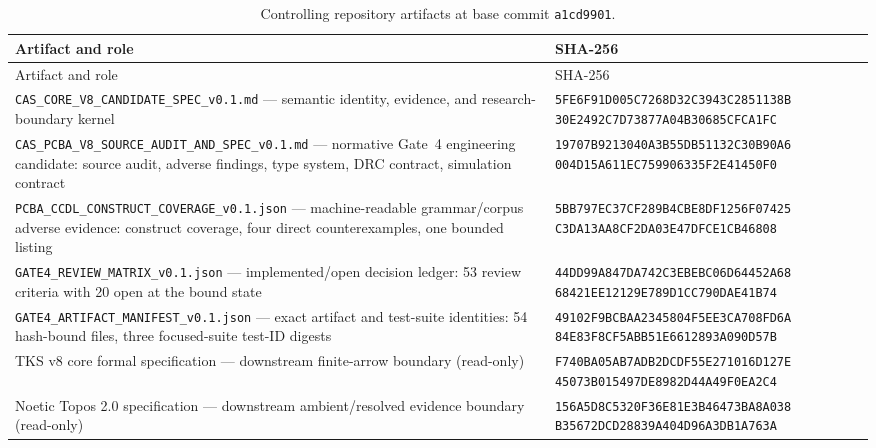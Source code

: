 \begin{longtable}{@{}p{5.2cm}p{7.6cm}@{}}
\caption{Controlling repository artifacts at base commit \texttt{a1cd9901}.}\label{ch03:tab:artifacts}\\
\toprule
Artifact and role & SHA-256 \\
\midrule
\endfirsthead
\toprule
Artifact and role & SHA-256 \\
\midrule
\endhead
\bottomrule
\endfoot
\texttt{CAS\_CORE\_V8\_CANDIDATE\_SPEC\_v0.1.md} --- semantic identity,
evidence, and research-boundary kernel &
\texttt{5FE6F91D005C7268D32C3943C2851138B\newline
30E2492C7D73877A04B30685CFCA1FC} \\[2pt]
\texttt{CAS\_PCBA\_V8\_SOURCE\_AUDIT\_AND\_SPEC\_v0.1.md} --- normative
Gate~4 engineering candidate: source audit, adverse findings, type
system, DRC contract, simulation contract &
\texttt{19707B9213040A3B55DB51132C30B90A6\newline
004D15A611EC759906335F2E41450F0} \\[2pt]
\texttt{PCBA\_CCDL\_CONSTRUCT\_COVERAGE\_v0.1.json} --- machine-readable
grammar/corpus adverse evidence: construct coverage, four direct
counterexamples, one bounded listing &
\texttt{5BB797EC37CF289B4CBE8DF1256F07425\newline
C3DA13AA8CF2DA03E47DFCE1CB46808} \\[2pt]
\texttt{GATE4\_REVIEW\_MATRIX\_v0.1.json} --- implemented/open decision
ledger: 53 review criteria with 20 open at the bound state &
\texttt{44DD99A847DA742C3EBEBC06D64452A68\newline
68421EE12129E789D1CC790DAE41B74} \\[2pt]
\texttt{GATE4\_ARTIFACT\_MANIFEST\_v0.1.json} --- exact artifact and
test-suite identities: 54 hash-bound files, three focused-suite test-ID
digests &
\texttt{49102F9BCBAA2345804F5EE3CA708FD6A\newline
84E83F8CF5ABB51E6612893A090D57B} \\[2pt]
TKS v8 core formal specification --- downstream finite-arrow boundary
(read-only) &
\texttt{F740BA05AB7ADB2DCDF55E271016D127E\newline
45073B015497DE8982D44A49F0EA2C4} \\[2pt]
Noetic Topos 2.0 specification --- downstream ambient/resolved evidence
boundary (read-only) &
\texttt{156A5D8C5320F36E81E3B46473BA8A038\newline
B35672DCD28839A404D96A3DB1A763A} \\
\end{longtable}

